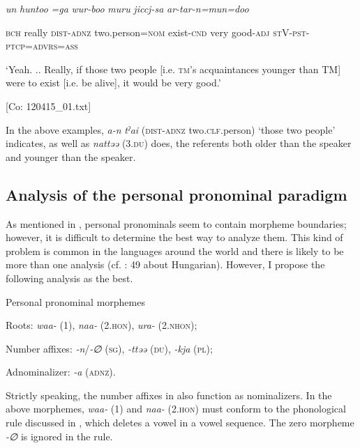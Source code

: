     \textit{un}  \textit{huntoo}  \textit{}  \textit{=ga}  \textit{wur-boo}  \textit{muru} \textit{jiccj-sa}  \textit{ar-tar-n=mun=doo}
                                                                                                  
    \textsc{bch}  really  \textsc{dist}-\textsc{adnz}  two.person=\textsc{nom}  exist-\textsc{cnd}  very   good-\textsc{adj}  \textsc{st}V-\textsc{pst}-\textsc{ptcp}=\textsc{advrs}=\textsc{ass}

    ‘Yeah. .. Really, if those two people [i.e. \textsc{tm}’s acquaintances younger than TM] were to exist [i.e. be alive], it would be very good.’

    [Co: 120415\_01.txt]
\z
\z

In the above examples, \textit{a-n} \textit{tˀai} (\textsc{dist}-\textsc{adnz} two.\textsc{clf}.person) ‘those two people’ indicates, as well as \textit{nattəə} (3.\textsc{du}) does, the referents both older than the speaker and younger than the speaker.

\subsection{Analysis of the personal pronominal paradigm}

As mentioned in , personal pronominals seem to contain morpheme boundaries; however, it is difficult to determine the best way to analyze them. This kind of problem is common in the languages around the world and there is likely to be more than one analysis (cf. \citealt{Comrie1989}: 49 about Hungarian). However, I propose the following analysis as the best.

\ea \label{ex:5:14}  Personal pronominal morphemes

Roots:      \textit{waa-} (1), \textit{naa-} (2.\textsc{hon}), \textit{ura-} (2.\textsc{nhon});

Number affixes:  \textit{{}-n}/\textit{{}-∅} (\textsc{sg}), \textit{{}-ttəə} (\textsc{du}), \textit{{}-kja} (\textsc{pl});

Adnominalizer:  \textit{{}-a} (\textsc{adnz}).
\z

\noindent Strictly speaking, the number affixes in  also function as nominalizers. In the above morphemes, \textit{waa-} (1) and \textit{naa-} (2.\textsc{hon}) must conform to the phonological rule discussed in , which deletes a vowel in a vowel sequence. The zero morpheme \textit{{}-∅} is ignored in the rule.

